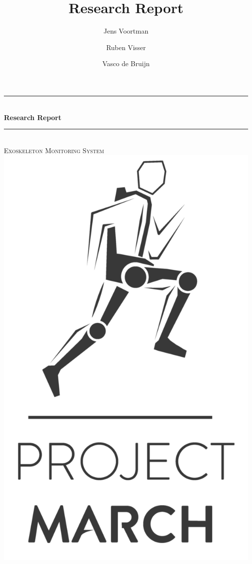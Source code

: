 \documentclass [a4paper,11pt]{article}
\title{Research Report}
\author{Jens Voortman \and Ruben Visser \and Vasco de Bruijn}
\begin{document}
\begin{titlepage}

\newcommand{\HRule}{\rule{\linewidth}{0.5mm}}
\centering

\HRule \\[0.4cm]
{ \huge \bfseries Research Report}\\ %
\HRule \\[0.4cm]

\textsc{\large Exoskeleton Monitoring System}\\[1.4cm]

\includegraphics[scale=0.1]{Project_MARCH2}\\[1.4cm]



\end{titlepage}
\end{document}
